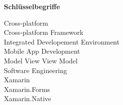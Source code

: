 %
%
% 
% 

\begin{center}
{\Large\bfseries Schlüsselbegriffe}
\end{center}

\noindent
Cross-platform\\
Cross-platform Framework\\
Integrated Developement Environment\\
Mobile App Development\\
Model View View Model\\
Software Engineering\\
Xamarin\\
Xamarin.Forms\\
Xamarin.Native\\
